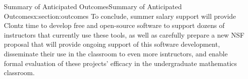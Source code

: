 \documentclass[oneside,10pt,]{article}
\begin{document}
%
%
\typeout{************************************************}
\typeout{************************************************}
%
\begin{sectionptx}{Summary of Anticipated Outcomes}{}{Summary of Anticipated Outcomes}{}{}{x:section:outcomes}
To conclude, summer salary support will provide Clontz time to develop free and open-source software to support dozens of instructors that currently use these tools, as well as carefully prepare a new NSF proposal that will provide ongoing support of this software development, disseminate their use in the classroom to even more isntructors, and enable formal evaluation of these projects' efficacy in the undergraduate mathematics classroom.%
\end{sectionptx}
%
%
%
\typeout{************************************************}
\typeout{************************************************}
%
\end{document}
